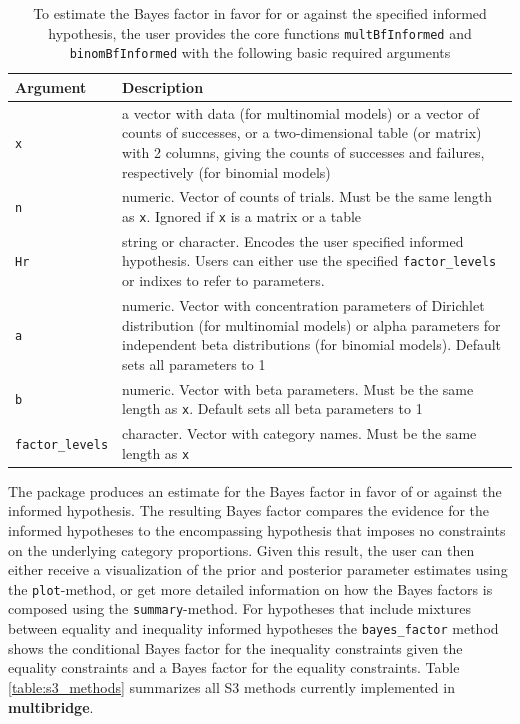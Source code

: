 \documentclass[
  english,
  man,floatsintext]{apa6}
\begin{document}
\begin{table}
\caption{To estimate the Bayes factor in favor for or against the specified informed hypothesis, the user provides the core functions \texttt{multBfInformed} and \texttt{binomBfInformed} with the following basic required arguments}
\label{tab:arguments}
\begin{center}
\begin{tabular}{p{4cm}p{12cm}}
        \toprule
Argument & Description \\\midrule
\texttt{x} & a vector with data (for multinomial models) or a vector of counts of successes, or a two-dimensional table (or matrix) with 2 columns, giving the counts of successes and failures, respectively (for binomial models)  \\
\texttt{n} &  numeric. Vector of counts of trials. Must be the same length as \texttt{x}. Ignored if \texttt{x} is a matrix or a table \\
\texttt{Hr} & string or character. Encodes the user specified informed hypothesis. Users can either use the specified \texttt{factor\_levels} or indixes to refer to parameters.\\
\texttt{a} & numeric. Vector with concentration parameters of Dirichlet distribution (for multinomial models) or alpha parameters for independent beta distributions (for binomial models). Default sets all parameters to 1 \\
\texttt{b} & numeric. Vector with beta parameters. Must be the same length as \texttt{x}. Default sets all beta parameters to 1 \\
\texttt{factor\_levels} &  character. Vector with category names. Must be the same length as \texttt{x}\\
\bottomrule
\end{tabular}
\end{center}
\end{table}

The package produces an estimate for the Bayes factor in favor of or against the informed hypothesis. The resulting Bayes factor compares the evidence for the informed hypotheses to the encompassing hypothesis that imposes no constraints on the underlying category proportions. Given this result, the user can then either receive a visualization of the prior and posterior parameter estimates using the \texttt{plot}-method, or get more detailed information on how the Bayes factors is composed using the \texttt{summary}-method. For hypotheses that include mixtures between equality and inequality informed hypotheses the \texttt{bayes\_factor} method shows the conditional Bayes factor for the inequality constraints given the equality constraints and a Bayes factor for the equality constraints. Table \ref{table:s3_methods} summarizes all S3 methods currently implemented in \textbf{multibridge}.
\end{document}
